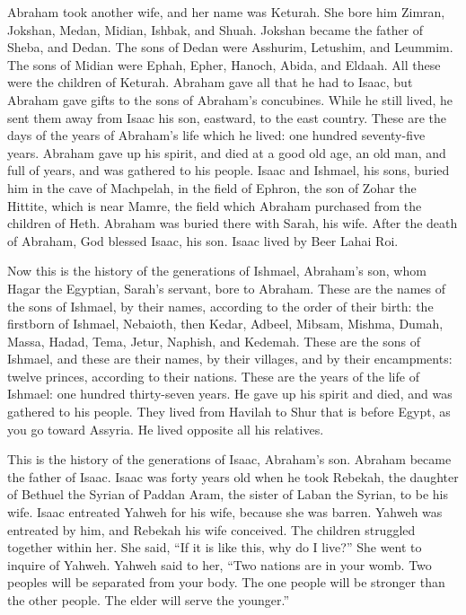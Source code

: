  Abraham took another wife, and her name was Keturah.
 She bore him Zimran, Jokshan, Medan, Midian, Ishbak, and
Shuah.  Jokshan became the father of Sheba, and Dedan. The
sons of Dedan were Asshurim, Letushim, and Leummim.  The
sons of Midian were Ephah, Epher, Hanoch, Abida, and Eldaah. All these
were the children of Keturah.  Abraham gave all that he had
to Isaac,  but Abraham gave gifts to the sons of Abraham's
concubines. While he still lived, he sent them away from Isaac his son,
eastward, to the east country.  These are the days of the
years of Abraham's life which he lived: one hundred seventy-five years.
 Abraham gave up his spirit, and died at a good old age, an
old man, and full of years, and was gathered to his people. 
Isaac and Ishmael, his sons, buried him in the cave of Machpelah, in the
field of Ephron, the son of Zohar the Hittite, which is near Mamre,
 the field which Abraham purchased from the children of
Heth. Abraham was buried there with Sarah, his wife.  After
the death of Abraham, God blessed Isaac, his son. Isaac lived by Beer
Lahai Roi.

 Now this is the history of the generations of Ishmael,
Abraham's son, whom Hagar the Egyptian, Sarah's servant, bore to
Abraham.  These are the names of the sons of Ishmael, by
their names, according to the order of their birth: the firstborn of
Ishmael, Nebaioth, then Kedar, Adbeel, Mibsam,  Mishma,
Dumah, Massa,  Hadad, Tema, Jetur, Naphish, and Kedemah.
 These are the sons of Ishmael, and these are their names,
by their villages, and by their encampments: twelve princes, according
to their nations.  These are the years of the life of
Ishmael: one hundred thirty-seven years. He gave up his spirit and died,
and was gathered to his people.  They lived from Havilah to
Shur that is before Egypt, as you go toward Assyria. He lived opposite
all his relatives.

 This is the history of the generations of Isaac, Abraham's
son. Abraham became the father of Isaac.  Isaac was forty
years old when he took Rebekah, the daughter of Bethuel the Syrian of
Paddan Aram, the sister of Laban the Syrian, to be his wife.
 Isaac entreated Yahweh for his wife, because she was
barren. Yahweh was entreated by him, and Rebekah his wife conceived.
 The children struggled together within her. She said, ``If
it is like this, why do I live?'' She went to inquire of Yahweh.
 Yahweh said to her, ``Two nations are in your womb. Two
peoples will be separated from your body. The one people will be
stronger than the other people. The elder will serve the younger.''

